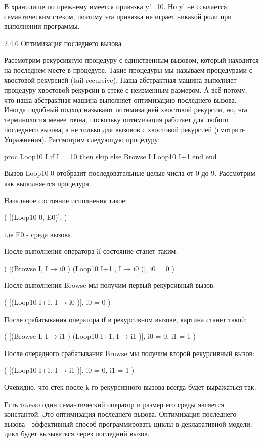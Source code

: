 В хранилище по прежнему имеется привязка y'=10. Но y' не ссылается семантическим стеком, поэтому эта привязка не играет никакой роли при выполнении программы.

2.4.6 Оптимизация последнего вызова

Рассмотрим рекурсивную процедуру с единственным вызовом, который находится на последнем месте в процедуре. Такие процедуры мы называем процедурами с хвостовой рекурсией (tail-recursive). Наша абстрактная машина выполняет процедуру хвостовой рекурсии в стеке с неизменным размером. А всё потому, что наша абстрактная машина выполняет оптимизацию последнего вызова. Иногда подобный подход называют оптимизацией хвостовой рекурсии, но, эта терминология менее точна, поскольку оптимизация работает для любого последнего вызова, а не только для вызовов с хвостовой рекурсией (смотрите Упражнения). Рассмотрим следующую процедуру:

proc {Loop10 I}
if I==10 then skip
else
{Browse I}
{Loop10 I+1}
end
end

Вызов {Loop10 0} отобразит последовательные целые числа от 0 до 9. Рассмотрим как выполняется процедура.

Начальное состояние исполнения такое:

( [({Loop10 0}, E0)],
 )

где E0 - среда вызова.

После выполнения оператора if состояние станет таким:

( [({Browse I}, {I → i0 }) ({Loop10 I+1} , {I → i0 })],
{i0 = 0}  )

После выполнения Browse мы получим первый рекурсивный вызов:

( [({Loop10 I+1}, {I → i0 })],
{i0 = 0}  )

После срабатывания оператора if в рекурсивном вызове, картина станет такой:

( [({Browse I}, {I → i1 }) ({Loop10 I+1}, {I → i1 })],
{i0 = 0, i1 = 1}  )

После очередного срабатывания Browse мы получим второй рекурсивный вызов:

( [({Loop10 I+1}, {I → i1 })],
{i0 = 0, i1 = 1}  )

Очевидно, что стек после k-го рекурсивного вызова всегда будет выражаться так:



Есть только один семантический оператор и размер его среды является константой. Это оптимизация последнего вызова. Оптимизация последнего вызова - эффективный способ программировать циклы в декларативной модели: цикл будет вызываться через последний вызов.

